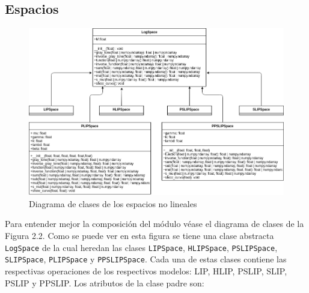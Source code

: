 \subsection{Espacios}

\begin{figure}
	\begin{center}
		\includegraphics[width=16.0 cm]{images/spaces_class_diagram.png}
		\caption{Diagrama de clases de los espacios no lineales}
	\end{center}
\end{figure}

Para entender mejor la composici\'on del m\'odulo v\'ease el diagrama de clases de la Figura 2.2. Como se puede ver en esta figura se tiene una clase abstracta \verb|LogSpace| de la cual heredan las clases \verb|LIPSpace|, \verb|HLIPSpace|, \verb|PSLIPSpace|, \verb|SLIPSpace|, \verb|PLIPSpace| y \verb|PPSLIPSpace|. Cada una de estas clases contiene las respectivas operaciones de los respectivos modelos: LIP, HLIP, PSLIP, SLIP, PSLIP y PPSLIP. Los atributos de la clase padre son:

